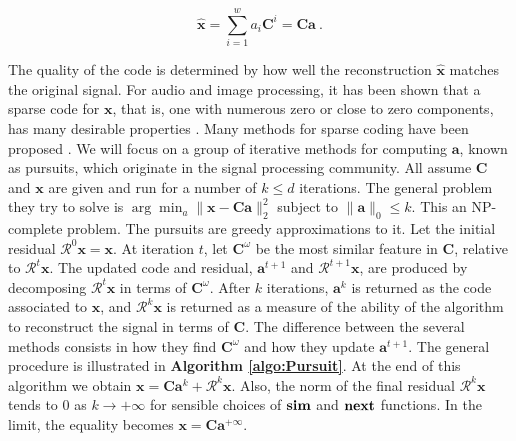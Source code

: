 \documentclass[runningheads,a4paper]{llncs}
\begin{document}
\begin{equation}
\hat{\textbf{x}} = \sum_{i=1}^w {a_i \textbf{C}^i} = \textbf{C}\textbf{a}~.
\end{equation}

The quality of the code is determined by how well the reconstruction $\hat{\textbf{x}}$ matches the original signal. For audio and image processing, it has been shown that a sparse code for $\textbf{x}$, that is, one with numerous zero or close to zero components, has many desirable properties \cite{emergence-sparse-coding,sparse-coding-strategy-V1}. Many methods for sparse coding have been proposed \cite{undetermined-minimal-L1,sparse-coding-strategy-V1}. We will focus on a group of iterative methods for computing $\textbf{a}$, known as pursuits, which originate in the signal processing community. All assume $\textbf{C}$ and $\textbf{x}$ are given and run for a number of $k \leq d$ iterations. The general problem they try to solve is $\arg\min_a \|\textbf{x} - \textbf{C}\textbf{a}\|_2^2$ subject to $\|\textbf{a}\|_0 \leq k$. This an NP-complete problem. The pursuits are greedy approximations to it. Let the initial residual $\mathcal{R}^0\textbf{x} = \textbf{x}$. At iteration $t$, let $\textbf{C}^\omega$ be the most similar feature in $\textbf{C}$, relative to $\mathcal{R}^t\textbf{x}$. The updated code and residual, $\textbf{a}^{t+1}$ and $\mathcal{R}^{t+1}\textbf{x}$, are produced by decomposing $\mathcal{R}^t\textbf{x}$ in terms of $\textbf{C}^\omega$. After $k$ iterations, $\textbf{a}^k$ is returned as the code associated to $\textbf{x}$, and $\mathcal{R}^k\textbf{x}$ is returned as a measure of the ability of the algorithm to reconstruct the signal in terms of $\textbf{C}$. The difference between the several methods consists in how they find $\textbf{C}^\omega$ and how they update $\textbf{a}^{t+1}$. The general procedure is illustrated in \textbf{Algorithm \ref{algo:Pursuit}}. At the end of this algorithm we obtain $\textbf{x} = \textbf{C}\textbf{a}^k + \mathcal{R}^k\textbf{x}$. Also, the norm of the final residual $\mathcal{R}^k\textbf{x}$ tends to $0$ as $k \rightarrow +\infty$ for sensible choices of $\text{\textbf{sim}}$ and $\text{\textbf{next}}$ functions. In the limit, the equality becomes $\textbf{x} = \textbf{C}\textbf{a}^{+\infty}$. 
\end{document}
